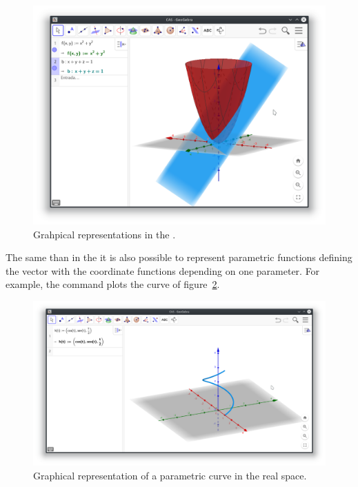 \begin{figure}[h!]
\begin{center}
\includegraphics[width=\textwidth]{img/introduction/3D-graphic-view}
\caption{Grahpical representations in the .} \label{g:3D-graphics-view}
\end{center}
\end{figure}

The same than in the  it is also possible to represent parametric functions defining the vector with the coordinate functions depending on one parameter.
For example, the command  plots the curve of figure~\ref{g:3D-parametric-curve}.

\begin{figure}[h!]
\begin{center}
\includegraphics[width=\textwidth]{img/introduction/3D-parametric-curve}
\caption{Graphical representation of a parametric curve in the real space.} \label{g:3D-parametric-curve}
\end{center}
\end{figure}


